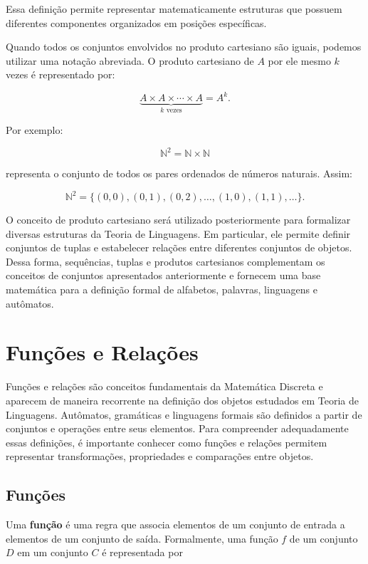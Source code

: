 \documentclass[
  brazilian,
  letterpaper,
]{book}
\theoremstyle{plain}
\theoremstyle{definition}
\theoremstyle{remark}
\begin{document}
Essa definição permite representar matematicamente estruturas que
possuem diferentes componentes organizados em posições específicas.

Quando todos os conjuntos envolvidos no produto cartesiano são iguais,
podemos utilizar uma notação abreviada. O produto cartesiano de \(A\)
por ele mesmo \(k\) vezes é representado por:

\[
\underbrace{A\times A\times\cdots\times A}_{k\text{ vezes}}
=A^k.
\]

Por exemplo:

\[
\mathbb{N}^2=\mathbb{N}\times\mathbb{N}
\]

representa o conjunto de todos os pares ordenados de números naturais.
Assim:

\[
\mathbb{N}^2=
\{(0,0),(0,1),(0,2),\ldots,(1,0),(1,1),\ldots\}.
\]

O conceito de produto cartesiano será utilizado posteriormente para
formalizar diversas estruturas da Teoria de Linguagens. Em particular,
ele permite definir conjuntos de tuplas e estabelecer relações entre
diferentes conjuntos de objetos. Dessa forma, sequências, tuplas e
produtos cartesianos complementam os conceitos de conjuntos apresentados
anteriormente e fornecem uma base matemática para a definição formal de
alfabetos, palavras, linguagens e autômatos.

\section{Funções e Relações}\label{funuxe7uxf5es-e-relauxe7uxf5es}

Funções e relações são conceitos fundamentais da Matemática Discreta e
aparecem de maneira recorrente na definição dos objetos estudados em
Teoria de Linguagens. Autômatos, gramáticas e linguagens formais são
definidos a partir de conjuntos e operações entre seus elementos. Para
compreender adequadamente essas definições, é importante conhecer como
funções e relações permitem representar transformações, propriedades e
comparações entre objetos.

\subsection{Funções}\label{funuxe7uxf5es}

Uma \textbf{função} é uma regra que associa elementos de um conjunto de
entrada a elementos de um conjunto de saída. Formalmente, uma função
\(f\) de um conjunto \(D\) em um conjunto \(C\) é representada por
\end{document}
